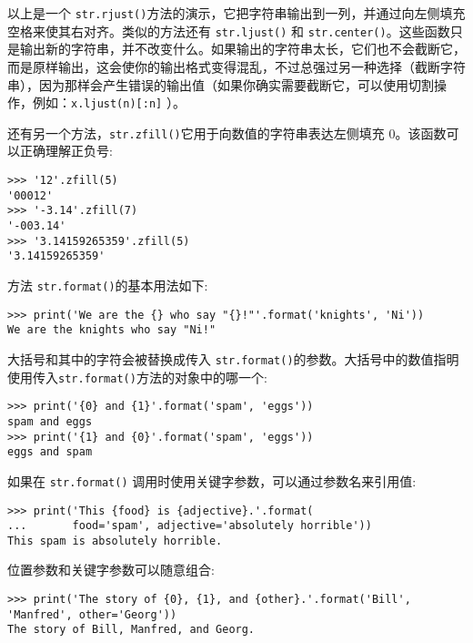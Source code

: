 以上是一个 \texttt{str.rjust()}方法的演示，它把字符串输出到一列，并通过向左侧填充空格来使其右对齐。类似的方法还有 \texttt{str.ljust()} 和 \texttt{str.center()}。这些函数只是输出新的字符串，并不改变什么。如果输出的字符串太长，它们也不会截断它，而是原样输出，这会使你的输出格式变得混乱，不过总强过另一种选择（截断字符串），因为那样会产生错误的输出值（如果你确实需要截断它，可以使用切割操作，例如：\texttt{x.ljust(n)[:n]} ）。

还有另一个方法，\texttt{str.zfill()}它用于向数值的字符串表达左侧填充 0。该函数可以正确理解正负号:
\begin{lstlisting}
>>> '12'.zfill(5)
'00012'
>>> '-3.14'.zfill(7)
'-003.14'
>>> '3.14159265359'.zfill(5)
'3.14159265359'
\end{lstlisting}
方法 \texttt{str.format()}的基本用法如下:
\begin{lstlisting}
>>> print('We are the {} who say "{}!"'.format('knights', 'Ni'))
We are the knights who say "Ni!"
\end{lstlisting}
大括号和其中的字符会被替换成传入 \texttt{str.format()}的参数。大括号中的数值指明使用传入\texttt{str.format()}方法的对象中的哪一个:
\begin{lstlisting}
>>> print('{0} and {1}'.format('spam', 'eggs'))
spam and eggs
>>> print('{1} and {0}'.format('spam', 'eggs'))
eggs and spam
\end{lstlisting}
如果在 \texttt{str.format()} 调用时使用关键字参数，可以通过参数名来引用值:
\begin{lstlisting}
>>> print('This {food} is {adjective}.'.format(
...       food='spam', adjective='absolutely horrible'))
This spam is absolutely horrible.
\end{lstlisting}
位置参数和关键字参数可以随意组合:
\begin{lstlisting}
>>> print('The story of {0}, {1}, and {other}.'.format('Bill', 'Manfred', other='Georg'))
The story of Bill, Manfred, and Georg.
\end{lstlisting}

